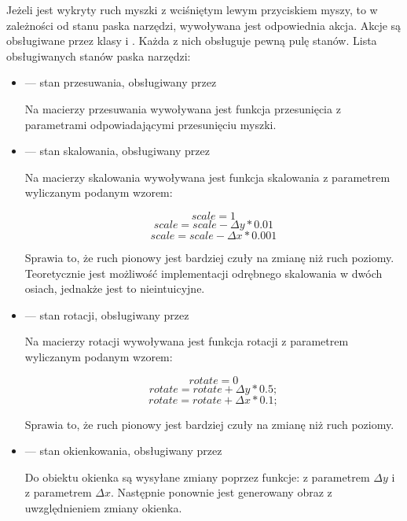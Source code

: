 \par
Jeżeli jest wykryty ruch myszki z wciśniętym lewym przyciskiem myszy, to w zależności od stanu paska narzędzi, wywoływana jest odpowiednia akcja.
Akcje są obsługiwane przez klasy  i .
Każda z nich obsługuje pewną pulę stanów.
Lista obsługiwanych stanów paska narzędzi:
\begin{itemize}
    \item {} --- stan przesuwania, obsługiwany przez 

          Na macierzy przesuwania wywoływana jest funkcja przesunięcia  z parametrami odpowiadającymi przesunięciu myszki.

    \item {} --- stan skalowania, obsługiwany przez 

          Na macierzy skalowania wywoływana jest funkcja skalowania  z parametrem  wyliczanym podanym wzorem:

          \[scale=1\]
          \[scale=scale-{\Delta}y*0.01\]
          \[scale=scale-{\Delta}x*0.001\]

          Sprawia to, że ruch pionowy jest bardziej czuły na zmianę niż ruch poziomy.
          Teoretycznie jest możliwość implementacji odrębnego skalowania w dwóch osiach, jednakże jest to nieintuicyjne.

    \item {} --- stan rotacji, obsługiwany przez 

          Na macierzy rotacji wywoływana jest funkcja rotacji  z parametrem  wyliczanym podanym wzorem:

          \[rotate = 0\]
          \[rotate = rotate + {\Delta}y * 0.5;\]
          \[rotate = rotate + {\Delta}x * 0.1;\]

          Sprawia to, że ruch pionowy jest bardziej czuły na zmianę niż ruch poziomy.

    \item {} --- stan okienkowania, obsługiwany przez 

          Do obiektu okienka są wysyłane zmiany poprzez funkcje:  z parametrem ${\Delta}y$ i  z parametrem ${\Delta}x$.
          Następnie ponownie jest generowany obraz z uwzględnieniem zmiany okienka.

\end{itemize}

